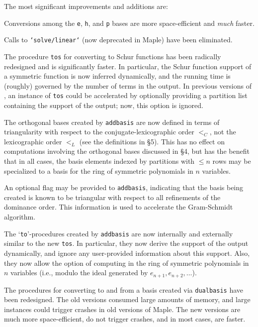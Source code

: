  The most significant improvements and additions are:

\bitem Conversions among the {\tt e}, {\tt h}, and {\tt p} bases are
more space-efficient and {\it much} faster.

\bitem Calls to {\tt `solve/linear`} (now deprecated in Maple) have
been eliminated.

\bitem The procedure {\tt tos} for converting to Schur functions has
been radically redesigned and is significantly faster. In particular,
the Schur function support of a symmetric function is now inferred
dynamically, and the running time is (roughly) governed by the number of
terms in the output. In previous versions of \SF, an instance of {\tt tos}
could be accelerated by optionally providing a partition list containing
the support of the output; now, this option is ignored.

\bitem The orthogonal bases created by {\tt add\ul{}basis} are now defined
in terms of triangularity with respect to the conjugate-lexicographic
order $<_C$, not the lexicographic order $<_L$ (see the definitions
in \S5). This has no effect on computations involving the orthogonal bases
discussed in \S4, but has the benefit that in all cases, the basis
elements indexed by partitions with $\le n$ rows may be specialized to
a basis for the ring of symmetric polynomials in $n$ variables.

\bitem An optional flag may be provided to {\tt add\ul{}basis},
indicating that the basis being created is known to be triangular with
respect to all refinements of the dominance order. This information is
used to accelerate the Gram-Schmidt algorithm.

\bitem The `{\tt to}'-procedures created by {\tt add\ul{}basis}
are now internally and externally similar to the new {\tt tos}.
In particular, they now derive the support of the output dynamically,
and ignore any user-provided information about this support. Also,
they now allow the option of computing in the ring of symmetric
polynomials in $n$ variables (i.e., modulo the ideal generated by
$e_{n+1},e_{n+2},\ldots$).

\bitem The procedures for converting to and from a basis created
via {\tt dual\ul{}basis} have been redesigned. The old versions
consumed large amounts of memory, and large instances could trigger
crashes in old versions of Maple. The new versions are much more
space-efficient, do not trigger crashes, and in most cases, are faster.

